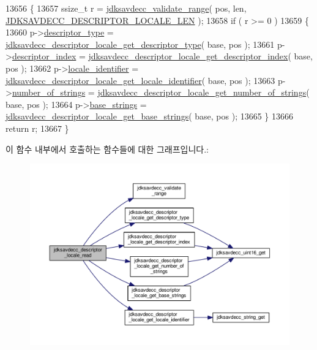 \begin{DoxyCode}
13656 \{
13657     ssize\_t r = \hyperlink{group__util_ga9c02bdfe76c69163647c3196db7a73a1}{jdksavdecc\_validate\_range}( pos, len, 
      \hyperlink{group__descriptor__locale_gaa79c61cd4ccd2cc3b8d73d8e8c17b48b}{JDKSAVDECC\_DESCRIPTOR\_LOCALE\_LEN} );
13658     \textcolor{keywordflow}{if} ( r >= 0 )
13659     \{
13660         p->\hyperlink{structjdksavdecc__descriptor__locale_ab7c32b6c7131c13d4ea3b7ee2f09b78d}{descriptor\_type} = 
      \hyperlink{group__descriptor__locale_ga7b7c3f434a6d9c60990c595f62d5dfa6}{jdksavdecc\_descriptor\_locale\_get\_descriptor\_type}( base, pos
       );
13661         p->\hyperlink{structjdksavdecc__descriptor__locale_a042bbc76d835b82d27c1932431ee38d4}{descriptor\_index} = 
      \hyperlink{group__descriptor__locale_gacc9a6ca9fcae307381f586bbd4dae5ae}{jdksavdecc\_descriptor\_locale\_get\_descriptor\_index}( base, 
      pos );
13662         p->\hyperlink{structjdksavdecc__descriptor__locale_a9bb3899edf7af17fb64933e1c3ad4f16}{locale\_identifier} = 
      \hyperlink{group__descriptor__locale_ga67b321affd857a64eb05f9b37377ff12}{jdksavdecc\_descriptor\_locale\_get\_locale\_identifier}( base,
       pos );
13663         p->\hyperlink{structjdksavdecc__descriptor__locale_a254c618149fe64f05a5e4ead8d5f046d}{number\_of\_strings} = 
      \hyperlink{group__descriptor__locale_ga6cdf46865c23b52b74d00b39e53b3bf6}{jdksavdecc\_descriptor\_locale\_get\_number\_of\_strings}( base,
       pos );
13664         p->\hyperlink{structjdksavdecc__descriptor__locale_a47d2427d6918399e13501f568f55dd26}{base\_strings} = 
      \hyperlink{group__descriptor__locale_gacf24c87b1d2be33314f3a86687aca010}{jdksavdecc\_descriptor\_locale\_get\_base\_strings}( base, pos );
13665     \}
13666     \textcolor{keywordflow}{return} r;
13667 \}
\end{DoxyCode}


이 함수 내부에서 호출하는 함수들에 대한 그래프입니다.\+:
\nopagebreak
\begin{figure}[H]
\begin{center}
\leavevmode
\includegraphics[width=350pt]{group__descriptor__locale_ga37a7f84832ecac0f38537670ec82fc2d_cgraph}
\end{center}
\end{figure}


